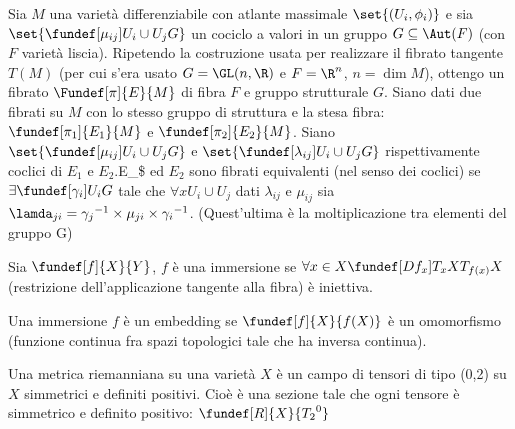 
\newcommand*\tc{\ \text{t.c.} \ } %
\newcommand*\dual{{^\ast}} %
\newcommand*\base[1][B]{\mathcal{#1}} %

\begin{defn}
Sia $M$ una varietà differenziabile con atlante massimale $\set{(U_i, \phi_i)}$ e sia $\set{ \fundef[\mu_{ij}]{U_i \cup U_j}{G} }$ un cociclo a valori in un gruppo $G \subseteq \Aut(F)$ (con $F$ varietà liscia). Ripetendo la costruzione usata per realizzare il fibrato tangente $T(M)$ (per cui s'era usato $G = \GL(n, \R)$ e $F=\R^n$, $n = \dim M$), ottengo un fibrato $\Fundef[\pi]{E}{M}$ di fibra $F$ e gruppo strutturale $G$.
Siano dati due fibrati su $M$ con lo stesso gruppo di struttura e la stesa fibra: $\fundef[\pi_1]{E_1}{M}$ e  $\fundef[\pi_2]{E_2}{M}$.
Siano $\set{ \fundef[\mu_{ij}]{U_i \cup U_j}{G} }$ e $\set{ \fundef[\lambda_{ij}]{U_i \cup U_j}{G} }$ rispettivamente coclici di $E_1$ e $E_2.
$E_\$ ed $E_2$ sono fibrati equivalenti (nel senso dei coclici) se $\exists \fundef[\gamma_{i}]{U_i}{G}$ tale che $\forall x U_i \cup U_j$ dati $\lambda_{ij}$ e $\mu_{ij}$
sia $\lamda_{ji} = {\gamma_j}^{-1} \times \mu_{ji} \times  {\gamma_i}^{-1}$.  (Quest'ultima è la moltiplicazione tra elementi del gruppo G)
\end{defn}

\begin{defn}
Sia $\fundef[f]{X}{Y}$, $f$ è una immersione se $\forall x \in X \fundef[Df_{x}]{T_{x}X}{T_{f(x)} X}$ (restrizione dell'applicazione tangente alla fibra) è iniettiva.
\end{defn}

\begin{defn}[Embedding] 
 Una immersione $f$ è un embedding se $\fundef[f]{X}{f(X)}$  è un omomorfismo (funzione continua fra spazi topologici tale che ha inversa continua).
\end{defn}


\begin{defn} %
 Una metrica riemanniana su una varietà $X$ è un campo di tensori di tipo (0,2) su $X$ simmetrici e definiti positivi. Cioè è una sezione tale che ogni tensore è simmetrico 
 e definito positivo: $\fundef[R]{X}{{T_{2}}^{0}}$ 
\end{defn}


